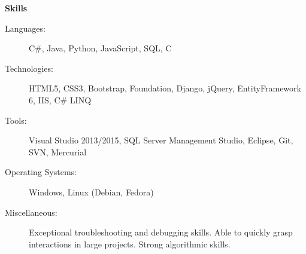 \documentclass[letterpaper,11pt]{article}
\newcommand{\resheading}[1]{{\large \colorbox{mygrey}{\begin{minipage}{\textwidth}{\textbf{#1 \vphantom{p\^{E}}}}\end{minipage}}}}
\begin{document}
	\resheading{Skills}
	\begin{description}
		\item[Languages:]
		C\#, Java, Python, JavaScript, SQL, C
		\item[Technologies:]
		HTML5, CSS3, Bootstrap, Foundation, Django, jQuery, EntityFramework 6, IIS, C\# LINQ
		\item[Tools:]
		Visual Studio 2013/2015, SQL Server Management Studio, Eclipse, Git, SVN, Mercurial
		\item[Operating Systems:]
		Windows, Linux (Debian, Fedora)
		\item[Miscellaneous:]
		Exceptional troubleshooting and debugging skills. Able to quickly grasp interactions in large projects.
		Strong algorithmic skills.
	\end{description}
\end{document}
